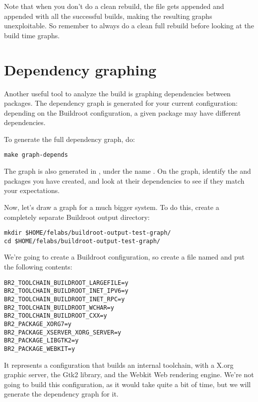 Note that when you don't do a clean rebuild, the 
file gets appended and appended with all the successful builds, making
the resulting graphs unexploitable. So remember to always do a clean
full rebuild before looking at the build time graphs.

\section{Dependency graphing}

Another useful tool to analyze the build is graphing dependencies
between packages. The dependency graph is generated for your current
configuration: depending on the Buildroot configuration, a given
package may have different dependencies.

To generate the full dependency graph, do:

\begin{verbatim}
make graph-depends
\end{verbatim}

The graph is also generated in , under the name
. On the graph, identify the  and
 packages you have created, and look at their
dependencies to see if they match your expectations.

Now, let's draw a graph for a much bigger system. To do this, create a
completely separate Buildroot output directory:

\begin{verbatim}
mkdir $HOME/felabs/buildroot-output-test-graph/
cd $HOME/felabs/buildroot-output-test-graph/
\end{verbatim}

We're going to create a Buildroot configuration, so create a file
named  and put the following contents:

\begin{verbatim}
BR2_TOOLCHAIN_BUILDROOT_LARGEFILE=y
BR2_TOOLCHAIN_BUILDROOT_INET_IPV6=y
BR2_TOOLCHAIN_BUILDROOT_INET_RPC=y
BR2_TOOLCHAIN_BUILDROOT_WCHAR=y
BR2_TOOLCHAIN_BUILDROOT_CXX=y
BR2_PACKAGE_XORG7=y
BR2_PACKAGE_XSERVER_XORG_SERVER=y
BR2_PACKAGE_LIBGTK2=y
BR2_PACKAGE_WEBKIT=y
\end{verbatim}

It represents a configuration that builds an internal toolchain, with
a X.org graphic server, the Gtk2 library, and the Webkit Web rendering
engine. We're not going to build this configuration, as it would take
quite a bit of time, but we will generate the dependency graph for it.

